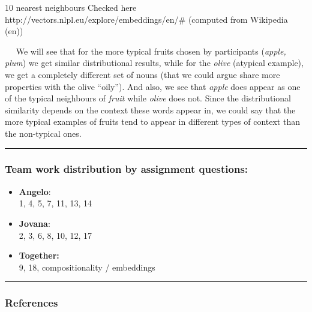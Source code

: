 \documentclass[11pt]{article}
\begin{document}
10 nearest neighbours Checked here
http://vectors.nlpl.eu/explore/embeddings/en/\# (computed from Wikipedia
(en))

   We will see that for the more typical fruits chosen by participants
(\emph{apple, plum}) we get similar distributional results, while for
the \emph{olive} (atypical example), we get a completely different set
of nouns (that we could argue share more properties with the olive
``oily''). And also, we see that \emph{apple} does appear as one of the
typical neighbours of \emph{fruit} while \emph{olive} does not. Since
the distributional similarity depends on the context these words appear
in, we could say that the more typical examples of fruits tend to appear
in different types of context than the non-typical ones.

    \begin{center}\rule{0.5\linewidth}{\linethickness}\end{center}

\hypertarget{team-work-distribution-by-assignment-questions}{%
\subsubsection{Team work distribution by assignment
questions:}\label{team-work-distribution-by-assignment-questions}}

\begin{itemize}
\item
  \textbf{Angelo}:\\
  1, 4, 5, 7, 11, 13, 14
\item
  \textbf{Jovana}:\\
  2, 3, 6, 8, 10, 12, 17
\item
  \textbf{Together:}\\
  9, 18, compositionality / embeddings
\end{itemize}

    \begin{center}\rule{0.5\linewidth}{\linethickness}\end{center}

\hypertarget{references}{%
\subsubsection{References}\label{references}}
\end{document}

